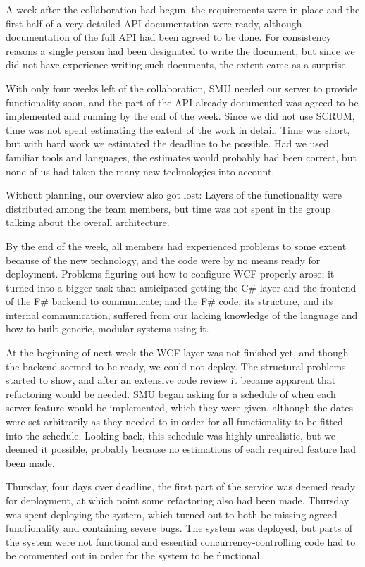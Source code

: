 A week after the collaboration had begun, the requirements were in place and the first half of a very detailed API documentation were ready, although documentation of the full API had been agreed to be done. For consistency reasons a single person had been designated to write the document, but since we did not have experience writing such documents, the extent came as a surprise.

With only four weeks left of the collaboration, SMU needed our server to provide functionality soon, and the part of the API already documented was agreed to be implemented and running by the end of the week. Since we did not use SCRUM, time was not spent estimating the extent of the work in detail. Time was short, but with hard work we estimated the deadline to be possible.
Had we used familiar tools and languages, the estimates would probably had been correct, but none of us had taken the many new technologies into account.

Without planning, our overview also got lost: Layers of the functionality were distributed among the team members, but time was not spent in the group talking about the overall architecture.

By the end of the week, all members had experienced problems to some extent because of the new technology, and the code were by no means ready for deployment.
Problems figuring out how to configure WCF properly arose; it turned into a bigger task than anticipated getting the C\# layer and the frontend of the F\# backend to communicate; and the F\# code, its structure, and its internal communication, suffered from our lacking knowledge of the language and how to built generic, modular systems using it.

At the beginning of next week the WCF layer was not finished yet, and though the backend seemed to be ready, we could not deploy. The structural problems started to show, and after an extensive code review it became apparent that refactoring would be needed.
SMU began asking for a schedule of when each server feature would be implemented, which they were given, although the dates were set arbitrarily as they needed to in order for all functionality to be fitted into the schedule. Looking back, this schedule was highly unrealistic, but we deemed it possible, probably because no estimations of each required feature had been made.

Thursday, four days over deadline, the first part of the service was deemed ready for deployment, at which point some refactoring also had been made. Thursday was spent deploying the system, which turned out to both be missing agreed functionality and containing severe bugs. The system was deployed, but parts of the system were not functional and essential concurrency-controlling code had to be commented out in order for the system to be functional.

